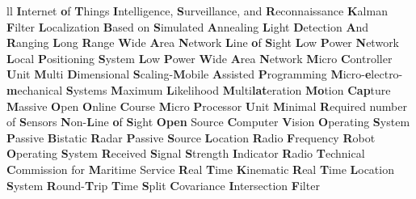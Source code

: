 \begin{abbreviations}{ll}
    		{\textbf{I}nternet \textbf{o}f \textbf{T}hings}
    		{\textbf{I}ntelligence, \textbf{S}urveillance, and \textbf{R}econnaissance}
    			{\textbf{K}alman \textbf{F}ilter}
    		{\textbf{L}ocalization \textbf{B}ased on \textbf{S}imulated \textbf{A}nnealing}
    		{\textbf{L}ight \textbf{D}etection \textbf{A}nd \textbf{R}anging}
    	{\textbf{L}ong \textbf{R}ange \textbf{W}ide \textbf{A}rea \textbf{N}etwork}
    		{\textbf{L}ine   \textbf{o}f \textbf{S}ight}
    		{\textbf{L}ow \textbf{P}ower \textbf{N}etwork}
    		{\textbf{L}ocal \textbf{P}ositioning \textbf{S}ystem}
    		{\textbf{L}ow \textbf{P}ower \textbf{W}ide \textbf{A}rea \textbf{N}etwork}
    		{\textbf{M}icro \textbf{C}ontroller \textbf{U}nit}
    	{\textbf{M}ulti \textbf{D}imensional \textbf{S}caling-\textbf{M}obile \textbf{A}ssisted \textbf{P}rogramming}
    		{\textbf{M}icro-\textbf{e}lectro-\textbf{m}echanical \textbf{S}ystems}
    			{\textbf{M}aximum \textbf{L}ikelihood}
    		{\textbf{M}ulti\textbf{lat}eration}
    		{\textbf{Mo}tion \textbf{Cap}ture}
    		{\textbf{M}assive \textbf{O}pen \textbf{O}nline \textbf{C}ourse}
    		{\textbf{M}icro \textbf{P}rocessor \textbf{U}nit}
    		{\textbf{M}inimal \textbf{R}equired number of \textbf{S}ensors}
    		{\textbf{N}on-\textbf{L}ine \textbf{o}f \textbf{S}ight}
    		{\textbf{Open} Source \textbf{C}omputer \textbf{V}ision}
    			{\textbf{O}perating \textbf{S}ystem}
    		{\textbf{P}assive \textbf{B}istatic \textbf{R}adar}
    		{\textbf{P}assive \textbf{S}ource \textbf{L}ocation}
    	   		{\textbf{R}adio \textbf{F}requency}
    		{\textbf{R}obot \textbf{O}perating \textbf{S}ystem}
    		{\textbf{R}eceived \textbf{S}ignal \textbf{S}trength \textbf{I}ndicator}
    		{\textbf{R}adio \textbf{T}echnical \textbf{C}ommission for \textbf{M}aritime Service}
    		{\textbf{R}eal \textbf{T}ime \textbf{K}inematic}
    		{\textbf{R}eal \textbf{T}ime \textbf{L}ocation \textbf{S}ystem}
    		{\textbf{R}ound-\textbf{T}rip \textbf{T}ime}
    		{\textbf{S}plit \textbf{C}ovariance \textbf{I}ntersection \textbf{F}ilter}

\end{abbreviations}
